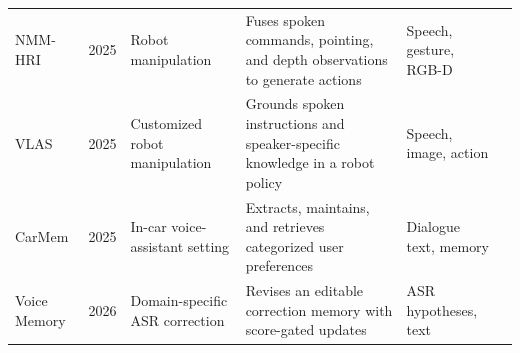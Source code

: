 \begin{table}[t]
\begin{tabularx}{\textwidth}{@{}>{\raggedright\arraybackslash}p{}c>{\raggedright\arraybackslash}p{}>{\raggedright\arraybackslash}X>{\raggedright\arraybackslash}p{}l@{}}
        \addlinespace
        NMM-HRI & 2025 & Robot manipulation & Fuses spoken commands, pointing, and depth observations to generate actions & Speech, gesture, RGB-D & \citep{DBLP:journals/corr/abs-2501-00785} \\
        VLAS & 2025 & Customized robot manipulation & Grounds spoken instructions and speaker-specific knowledge in a robot policy & Speech, image, action & \citep{DBLP:journals/corr/abs-2502-13508} \\
        \addlinespace
        CarMem & 2025 & In-car voice-assistant setting & Extracts, maintains, and retrieves categorized user preferences & Dialogue text, memory & \citep{DBLP:journals/corr/abs-2501-09645} \\
        Voice Memory & 2026 & Domain-specific ASR correction & Revises an editable correction memory with score-gated updates & ASR hypotheses, text & \citep{DBLP:journals/corr/abs-2607-26410} \\
        \bottomrule
    \end{tabularx}
\end{table}